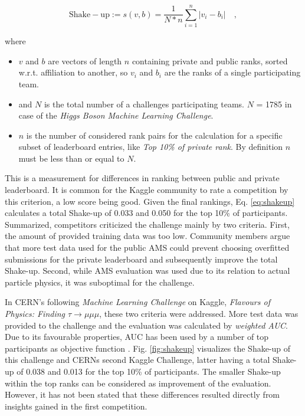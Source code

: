 \begin{equation}\label{eq:shakeup}
	\mathrm{Shake-up}:= s(v,b)= \frac{1}{N*n} \sum\limits_{i=1}^n |v_i-b_i| \mathrm{\hspace{1em},}
\end{equation}

where \begin{itemize}
	\item $v$ and $b$ are vectors of length $n$ containing private and public ranks, sorted w.r.t. affiliation to another, so $v_i$ and $b_i$ are the ranks of a single participating team.
	\item and $N$ is the total number of a challenges participating teams. $N$ = 1785 in case of the \emph{Higgs Boson Machine Learning Challenge}. 
	\item $n$ is the number of considered rank pairs for the calculation for a specific subset of leaderboard entries, like \emph{Top 10\% of private rank}. By definition $n$ must be less than or equal to $N$.
\end{itemize}

This is a measurement for differences in ranking between public and private leaderboard. It is common for the Kaggle community to rate a competition by this criterion, a low score being good. Given the final rankings, Eq. \eqref{eq:shakeup} calculates a total Shake-up of 0.033 and 0.050 for the top 10\% of participants. Summarized, competitors criticized the challenge mainly by two criteria. First, the amount of provided training data was too low. Community members argue that more test data used for the public AMS could prevent choosing overfitted submissions for the private leaderboard and subsequently improve the total Shake-up\cite{kaggleForum1,kaggleForum2}. Second, while AMS evaluation was used due to its relation to actual particle physics, it was suboptimal for the challenge.

In CERN's following \emph{Machine Learning Challenge} on Kaggle, \emph{Flavours of Physics: Finding $\tau \rightarrow \mu\mu\mu$}, these two criteria were addressed. More test data was provided to the challenge and the evaluation was calculated by \emph{weighted AUC}. Due to its favourable properties, AUC has been used by a number of top participants as objective function \cite{diaz14}. Fig. \ref{fig:shakeup} visualizes the Shake-up of this challenge and CERNs second Kaggle Challenge, latter having a total Shake-up of 0.038 and 0.013 for the top 10\% of participants. The smaller Shake-up within the top ranks can be considered as improvement of the evaluation.
However, it has not been stated that these differences resulted directly from insights gained in the first competition.

